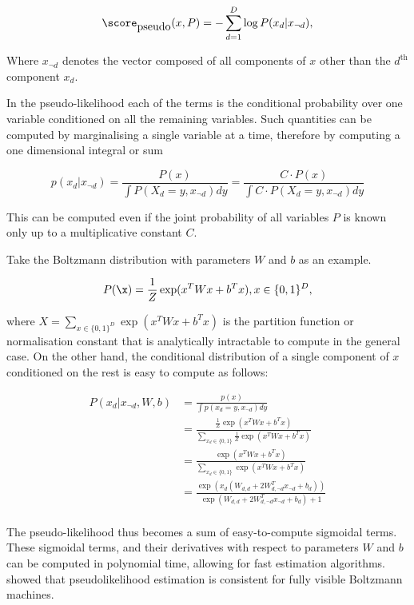 \begin{equation}
	\score_{\mbox{pseudo}}(x,P) = - \sum_{d=1}^{D} \log P(x_d\vert x_{\neg d}),
\end{equation}

Where $x_{\neg d}$ denotes the vector composed of all components of $x$ other than the $d^{\mbox{th}}$ component $x_d$. 

In the pseudo-likelihood each of the terms is the conditional probability over one variable conditioned on all the remaining variables. Such quantities can be computed by marginalising a single variable at a time, therefore by computing a one dimensional integral or sum

\begin{equation}
	p(x_d\vert x_{\neg d}) = \frac{P(x)}{\int P(X_d=y,x_{\neg d}) dy} = \frac{C \cdot P(x)}{\int C \cdot P(X_d=y,x_{\neg d}) dy}
\end{equation}

This can be computed even if the joint probability of all variables $P$ is known only up to a multiplicative constant $C$.

Take the Boltzmann distribution with parameters $W$ and $b$ as an example. 

\begin{equation}
	P(\x) = \frac{1}{Z}\exp(x^{T}Wx + b^{T}x), x\in\{0,1\}^D,
\end{equation}

where $X = \sum_{x\in\{0,1\}^D}\exp(x^{T}Wx + b^{T}x)$ is the partition function or normalisation constant that is analytically intractable to compute in the general case. On the other hand, the conditional distribution of a single component of $x$ conditioned on the rest is easy to compute as follows:

\begin{align}
	P(x_d\vert x_{\neg d}, W, b) &= \frac{p(x)}{\int p(x_d=y,x_{\neg d}) dy}\\
		&= \frac{\frac{1}{Z}\exp(x^{T}Wx + b^{T}x)}{\sum_{x_d\in\{0,1\}}\frac{1}{Z}\exp(x^{T}Wx + b^{T}x)}\\
		&= \frac{\exp(x^{T}Wx + b^{T}x)}{\sum_{x_d\in\{0,1\}}\exp(x^{T}Wx + b^{T}x)}\\
		&= \frac{\exp\left( x_d \left( W_{d,d} + 2 W_{d,\neg d}^{T}x_{\neg d} + b_d \right)\right)}{\exp( W_{d,d} + 2 W_{d,\neg d}^{T}x_{\neg d} + b_{d}) + 1}\\
\end{align}

The pseudo-likelihood thus becomes a sum of easy-to-compute sigmoidal terms. These sigmoidal terms, and their derivatives with respect to parameters $W$ and $b$ can be computed in polynomial time, allowing for fast estimation algorithms. \citep{Hyvarinen2006} showed that pseudolikelihood estimation is consistent for fully visible Boltzmann machines.

